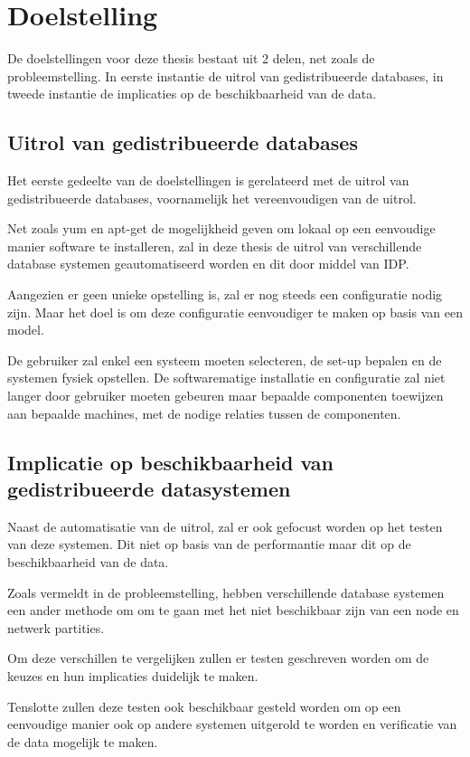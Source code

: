 \documentclass{book}
\begin{document}
\section{Doelstelling}
De doelstellingen voor deze thesis bestaat uit 2 delen, net zoals de probleemstelling. In eerste instantie de uitrol van gedistribueerde databases, in tweede instantie de implicaties op de beschikbaarheid van de data. 

\subsection{Uitrol van gedistribueerde databases}
Het eerste gedeelte van de doelstellingen is gerelateerd met de uitrol van gedistribueerde databases, voornamelijk het vereenvoudigen van de uitrol. 

Net zoals \gls{yum} en \gls{apt-get} de mogelijkheid geven om lokaal op een eenvoudige manier software te installeren, zal in deze thesis de uitrol van verschillende database systemen geautomatiseerd worden en dit door middel van \gls{IDP}. 

Aangezien er geen unieke opstelling is, zal er nog steeds een configuratie nodig zijn. Maar het doel is om deze configuratie eenvoudiger te maken op basis van een model. 

De gebruiker zal enkel een systeem moeten selecteren, de set-up bepalen en de systemen fysiek opstellen. De softwarematige installatie en configuratie zal niet langer door gebruiker moeten gebeuren maar bepaalde componenten toewijzen aan bepaalde machines, met de nodige relaties tussen de componenten. 

\subsection{Implicatie op beschikbaarheid van gedistribueerde datasystemen} 
Naast de automatisatie van de uitrol, zal er ook gefocust worden op het testen van deze systemen. Dit niet op basis van de performantie maar dit op de beschikbaarheid van de data. 

Zoals vermeldt in de probleemstelling, hebben verschillende database systemen een ander methode om om te gaan met het niet beschikbaar zijn van een node en netwerk partities. 

Om deze verschillen te vergelijken zullen er testen geschreven worden om de keuzes en hun implicaties duidelijk te maken. 

Tenslotte zullen deze testen ook beschikbaar gesteld worden om op een eenvoudige manier ook op andere systemen uitgerold te worden en verificatie van de data mogelijk te maken. 
\printglossary

\printbibliography
\end{document}

